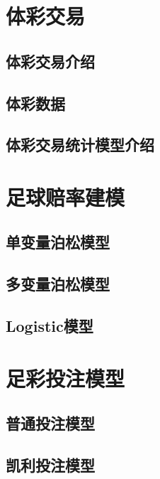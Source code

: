 \documentclass[]{book}
\begin{document}
\section{体彩交易}

\subsection{体彩交易介绍}

\subsection{体彩数据}

\subsection{体彩交易统计模型介绍}

\section{足球赔率建模}

\subsection{单变量泊松模型}

\subsection{多变量泊松模型}

\subsection{Logistic模型}\label{logistic}

\subsection{}\label{section-1}

\section{足彩投注模型}

\subsection{普通投注模型}

\subsection{凯利投注模型}
\end{document}
